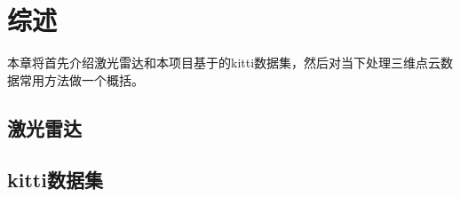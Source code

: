 \chapter{综述}
\label{cha:review}
本章将首先介绍激光雷达和本项目基于的kitti数据集，然后对当下处理三维点云数据常用方法做一个概括。
\section{激光雷达}
\label{sec:LiDAR}

\section{kitti数据集}
\label{sec:kitti}

\section{}



